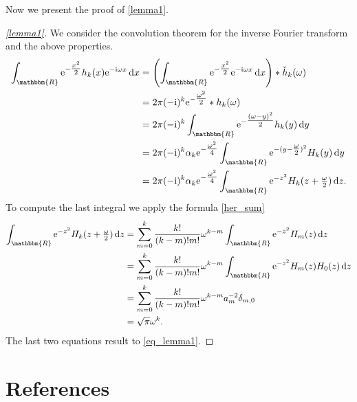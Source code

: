 \documentclass[a4paper,twoside,10pt]{article}
\theoremstyle{break}
\theoremstyle{nonumberplain}
\newtheorem{proof}{Proof}
\newcommand{\R}{\mathbbm{R}}
\newcommand{\e}{\mathrm e}
\renewcommand{\i}{\mathrm i}
\renewcommand{\d}{\,\mathrm d}
\begin{document}
Now we present the proof of \autoref{lemma1}.
\begin{proof}[\autoref{lemma1}]
We consider the convolution theorem for the inverse Fourier transform and the above properties.
\begin{equation*}
\begin{aligned}
\int_\R \e^{-\tfrac{x^2}2} h_k (x) \e^{- \i \omega  x } \d x &= \left( \int_\R \e^{-\tfrac{x^2}2}  \e^{- \i \omega  x } \d x\right) \ast \check{h}_k (\omega) \\
&= 2\pi (-\i)^k \e^{-
\tfrac{\omega^2}2} \ast h_k (\omega) \\
&= 2\pi (-\i)^k \int_\R \e^{-
\tfrac{(\omega-y)^2}2}  h_k (y) \d y \\
&= 2\pi (-\i)^k \alpha_k \e^{-
\tfrac{\omega^2}4} \int_\R \e^{-(y-
\tfrac{\omega}2 )^2}  H_k (y) \d y \\
&= 2\pi (-\i)^k \alpha_k \e^{-
\tfrac{\omega^2}4} \int_\R \e^{-z^2}  H_k (z + \tfrac{\omega}2) \d z .
\end{aligned}
\end{equation*}
To compute the last integral we apply the formula \eqref{her_sum}
\begin{equation*}
\begin{aligned}
\int_\R \e^{-z^2}  H_k (z + \tfrac{\omega}2) \d z &= \sum_{m=0}^k \frac{k!}{(k-m)!m!} \omega^{k-m}  \int_\R \e^{-z^2} H_m(z) \d z \\ 
&= \sum_{m=0}^k \frac{k!}{(k-m)!m!} \omega^{k-m}  \int_\R \e^{-z^2} H_m(z) H_0 (z) \d z \\
&= \sum_{m=0}^k \frac{k!}{(k-m)!m!} \omega^{k-m} a_m^{-2} \delta_{m,0 } \\
&= \sqrt{\pi} \omega^k .
\end{aligned}
\end{equation*}
The last two equations result to \eqref{eq_lemma1}.
\end{proof}


\section*{References}
\printbibliography[heading=none]
\end{document}

